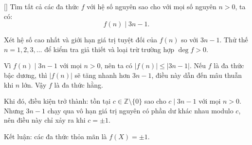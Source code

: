 \documentclass[../07-integer-polynomials.tex]{subfiles}
\begin{document}
\begin{exercise*}\label{example:FRA-2015-TST3-P1}[\textbf{}]
    Tìm tất cả các đa thức \( f \) với hệ số nguyên sao cho với mọi số nguyên \( n > 0 \), ta có:
    \[
        f(n) \mid 3n - 1.
    \]
\end{exercise*}

\begin{remark*}
    Xét hệ số cao nhất và giới hạn giá trị tuyệt đối của \( f(n) \) so với \( 3n - 1 \).
    Thử thế \( n = 1, 2, 3, \dots \) để kiểm tra giả thiết và loại trừ trường hợp \( \deg f > 0 \).
\end{remark*}

\begin{story*}
    Vì \( f(n) \mid 3n - 1 \) với mọi \( n > 0 \), nên ta có \( |f(n)| \le |3n - 1| \). Nếu \( f \) là đa thức bậc dương, thì \( |f(n)| \) sẽ tăng nhanh hơn \( 3n - 1 \), điều này dẫn đến mâu thuẫn khi \( n \) lớn. Vậy \( f \) là đa thức hằng.

    Khi đó, điều kiện trở thành: tồn tại \( c \in \mathbb{Z} \setminus \{0\} \) sao cho \( c \mid 3n - 1 \) với mọi \( n > 0 \). Nhưng \( 3n - 1 \) chạy qua vô hạn giá trị nguyên có phần dư khác nhau modulo \( c \), nên điều này chỉ xảy ra khi \( c = \pm1 \).

    Kết luận: các đa thức thỏa mãn là \( \boxed{f(X) = \pm1} \).
\end{story*}
\end{document}
